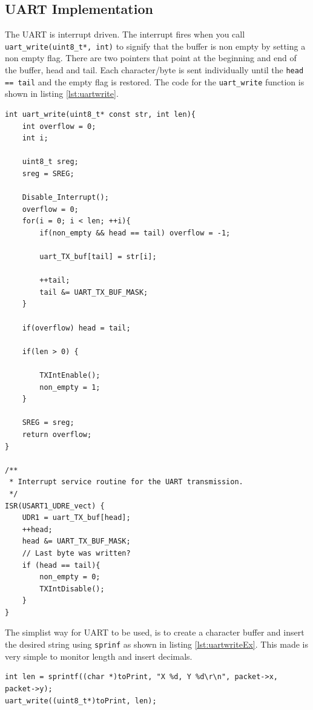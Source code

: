 \subsection{UART Implementation}
The UART is interrupt driven. The interrupt fires when you call
\texttt{uart\_write(uint8\_t*, int)} to signify that the buffer is non empty by
setting a non empty flag. There are two pointers that point at the beginning and
end of the buffer, head and tail. Each character/byte is sent individually until
the \texttt{head == tail} and the empty flag is restored. The code for the
\texttt{uart\_write} function is shown in listing \ref{lst:uartwrite}.

\begin{lstlisting}[label={lst:uartwrite},
                   caption={UART write function and ISR}]
int uart_write(uint8_t* const str, int len){
    int overflow = 0;
    int i;

    uint8_t sreg;
    sreg = SREG;

    Disable_Interrupt();
    overflow = 0;
    for(i = 0; i < len; ++i){  
        if(non_empty && head == tail) overflow = -1;

        uart_TX_buf[tail] = str[i];

        ++tail;
        tail &= UART_TX_BUF_MASK;
    }
    
    if(overflow) head = tail;     

    if(len > 0) {

        TXIntEnable();
        non_empty = 1;
    }

    SREG = sreg;
    return overflow; 
}

/**
 * Interrupt service routine for the UART transmission.
 */
ISR(USART1_UDRE_vect) {
    UDR1 = uart_TX_buf[head];
    ++head;
    head &= UART_TX_BUF_MASK;
    // Last byte was written?
    if (head == tail){
        non_empty = 0;
        TXIntDisable();
    }
}
\end{lstlisting}

The simplist way for UART to be used, is to create a character buffer and insert
the desired string using \texttt{sprinf} as shown in listing
\ref{lst:uartwriteEx}. This made is very simple to monitor length and insert
decimals. 

\begin{lstlisting}[float=ht,
                   caption={An example usage of \texttt{uart\_write} function},
                   label={lst:uartwriteEx}]
int len = sprintf((char *)toPrint, "X %d, Y %d\r\n", packet->x, packet->y);
uart_write((uint8_t*)toPrint, len);
\end{lstlisting}

